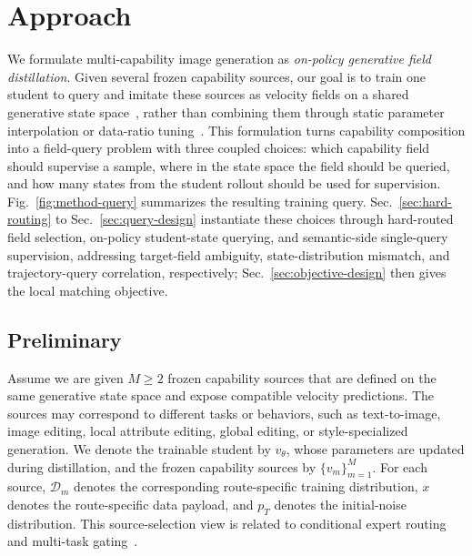 \section{Approach}
\label{sec:approach}

We formulate multi-capability image generation as \emph{on-policy generative field distillation}. Given several frozen capability sources, our goal is to train one student to query and imitate these sources as velocity fields on a shared generative state space~\cite{lipman2022flow,liu2022flow,albergo2025stochastic}, rather than combining them through static parameter interpolation or data-ratio tuning~\cite{ilharco2022editing,wortsman2022model,yadav2023ties}. This formulation turns capability composition into a field-query problem with three coupled choices: which capability field should supervise a sample, where in the state space the field should be queried, and how many states from the student rollout should be used for supervision. Fig.~\ref{fig:method-query} summarizes the resulting training query. Sec.~\ref{sec:hard-routing} to Sec.~\ref{sec:query-design} instantiate these choices through hard-routed field selection, on-policy student-state querying, and semantic-side single-query supervision, addressing target-field ambiguity, state-distribution mismatch, and trajectory-query correlation, respectively; Sec.~\ref{sec:objective-design} then gives the local matching objective.


\subsection{Preliminary}
\label{sec:composition-target}

Assume we are given $M\ge2$ frozen capability sources that are defined on the same generative state space and expose compatible velocity predictions. The sources may correspond to different tasks or behaviors, such as text-to-image, image editing, local attribute editing, global editing, or style-specialized generation. We denote the trainable student by $v_\theta$, whose parameters are updated during distillation, and the frozen capability sources by $\{v_m\}_{m=1}^{M}$. For each source, $\mathcal{D}_m$ denotes the corresponding route-specific training distribution, $x$ denotes the route-specific data payload, and $p_T$ denotes the initial-noise distribution. This source-selection view is related to conditional expert routing and multi-task gating~\cite{jacobs1991adaptive,shazeer2017outrageously,ma2018modeling}.

